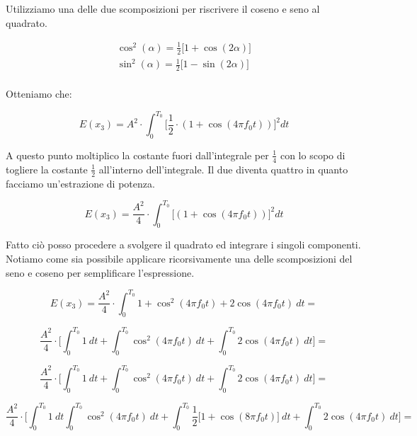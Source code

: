 \documentclass[../main.tex]{subfiles}
\begin{document}
Utilizziamo una delle due scomposizioni per riscrivere il coseno e seno al quadrato.

\begin{equation}
\begin{split}
	\cos^2(\alpha) = \frac{1}{2} \big[ 1 + \cos(2\alpha) \big] \\
	\sin^2(\alpha) = \frac{1}{2} \big[ 1 - \sin(2\alpha) \big] \\
\end{split}
\end{equation}

Otteniamo che:

\begin{equation}
	E(x_3) =  A^2 \cdot \int_0^{T_0} \bigg[ \frac{1}{2} \cdot (1 + \cos(4\pi f_0 t)) \bigg]^2 dt
\end{equation}

A questo punto moltiplico la costante fuori dall'integrale per $\frac{1}{4}$ con lo scopo di togliere la costante $\frac{1}{2}$ all'interno dell'integrale. Il due diventa quattro in quanto facciamo un'estrazione di potenza.

\begin{equation}
	E(x_3) =  \frac{A^2}{4} \cdot \int_0^{T_0} \bigg[ (1 + \cos(4\pi f_0 t)) \bigg]^2 dt
\end{equation}

Fatto ciò posso procedere a svolgere il quadrato ed integrare i singoli componenti. Notiamo come sia possibile applicare ricorsivamente una delle scomposizioni del seno e coseno per semplificare l'espressione.

\begin{equation}
	E(x_3) = \frac{A^2}{4} \cdot \int_0^{T_0} 1 + \cos^2(4\pi f_0 t) + 2 \cos(4\pi f_0 t)\: dt =
\end{equation}

\begin{equation}
	\frac{A^2}{4} \cdot \bigg[ \int_0^{T_0} 1 \:dt + \int_0^{T_0} \cos^2(4\pi f_0 t) \: dt + \int_0^{T_0} 2 \cos(4\pi f_0 t)\: dt \bigg] =
\end{equation}

\begin{equation}
	\frac{A^2}{4} \cdot \bigg[ \int_0^{T_0} 1 \:dt + \int_0^{T_0} \cos^2(4\pi f_0 t) \: dt + \int_0^{T_0} 2 \cos(4\pi f_0 t)\: dt \bigg] =
\end{equation}

\begin{equation}
	\frac{A^2}{4} \cdot \bigg[ \int_0^{T_0} 1 \:dt \int_0^{T_0} \cos^2(4\pi f_0 t) \: dt + \int_0^{T_0} \frac{1}{2} \big[ 1 + \cos(8\pi f_0 t) \big]\:dt + \int_0^{T_0} 2 \cos(4\pi f_0 t)\: dt \bigg] =
\end{equation}
\end{document}

